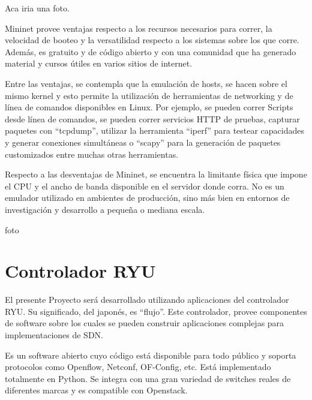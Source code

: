 \documentclass[12pt,a4paper,oneside]{book}
\begin{document}
Aca iria una foto.

Mininet provee ventajas respecto a los recursos necesarios para correr, la velocidad de booteo y la versatilidad respecto a los sistemas sobre los que corre. Además, es gratuito y de código abierto y con una comunidad que ha generado material y cursos útiles en varios sitios de internet.

\vspace{0.5cm}

Entre las ventajas, se contempla que la emulación de hosts, se hacen sobre el mismo kernel y esto permite la utilización de herramientas de networking y de línea de comandos disponibles en Linux. Por ejemplo, se pueden correr Scripts desde línea de comandos, se pueden correr servicios HTTP de pruebas, capturar paquetes con “tcpdump”, utilizar la herramienta “iperf” para testear capacidades y generar conexiones simultáneas o “scapy” para la generación de paquetes customizados entre muchas otras herramientas.

\vspace{0.5cm}

Respecto a las desventajas de Mininet, se encuentra la limitante física que impone el CPU y el ancho de banda disponible en el servidor donde corra. No es un emulador utilizado en ambientes de producción, sino más bien en entornos de investigación y desarrollo a pequeña o mediana escala.

foto



\section{Controlador RYU}
\label{marco_ryu}

El presente Proyecto será desarrollado utilizando aplicaciones del controlador RYU. Su significado, del japonés, es “flujo”. Este controlador, provee componentes de software sobre los cuales se pueden construir aplicaciones complejas para implementaciones de SDN. 

\vspace{0.5cm}

Es un software abierto cuyo código está disponible para todo público y soporta protocolos como Openflow, Netconf, OF-Config, etc. Está implementado totalmente en Python. Se integra con una gran variedad de switches reales de diferentes marcas y es compatible con Openstack.

\vspace{0.5cm}
\end{document}
